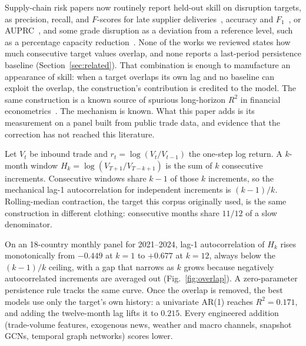 \documentclass[10pt]{article}
\begin{document}
Supply-chain risk papers now routinely report held-out skill on disruption targets, as precision, recall, and $F$-scores for late supplier deliveries~\citep{ref35,ref36}, accuracy and $F_1$~\citep{ref2,ref5}, or AUPRC~\citep{ref7}, and some grade disruption as a deviation from a reference level, such as a percentage capacity reduction~\citep{ref23}. None of the works we reviewed states how much consecutive target values overlap, and none reports a last-period persistence baseline (Section~\ref{sec:related}). That combination is enough to manufacture an appearance of skill: when a target overlaps its own lag and no baseline can exploit the overlap, the construction's contribution is credited to the model. The same construction is a known source of spurious long-horizon $R^2$ in financial econometrics~\citep{ref29,ref30,ref31,ref32}. The mechanism is known. What this paper adds is its measurement on a panel built from public trade data, and evidence that the correction has not reached this literature.

Let $V_t$ be inbound trade and $r_t=\log(V_t/V_{t-1})$ the one-step log return. A $k$-month window $H_k=\log(V_{T+1}/V_{T-k+1})$ is the sum of $k$ consecutive increments. Consecutive windows share $k-1$ of those $k$ increments, so the mechanical lag-1 autocorrelation for independent increments is $(k-1)/k$. Rolling-median contraction, the target this corpus originally used, is the same construction in different clothing: consecutive months share $11/12$ of a slow denominator.

On an 18-country monthly panel for 2021--2024, lag-1 autocorrelation of $H_k$ rises monotonically from $-0.449$ at $k=1$ to $+0.677$ at $k=12$, always below the $(k-1)/k$ ceiling, with a gap that narrows as $k$ grows because negatively autocorrelated increments are averaged out (Fig.~\ref{fig:overlap}). A zero-parameter persistence rule tracks the same curve. Once the overlap is removed, the best models use only the target's own history: a univariate AR(1) reaches $R^2=0.171$, and adding the twelve-month lag lifts it to $0.215$. Every engineered addition (trade-volume features, exogenous news, weather and macro channels, snapshot GCNs, temporal graph networks) scores lower.
\end{document}

